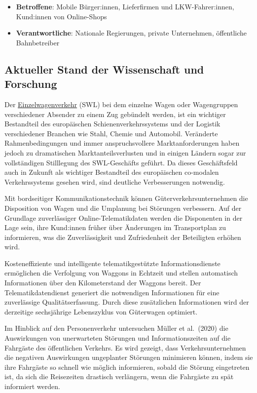 \documentclass[
]{book}
\providecommand{\tightlist}{%
  \setlength{\itemsep}{0pt}\setlength{\parskip}{0pt}}
\begin{document}
\begin{itemize}
\tightlist
\item
  \textbf{Betroffene}: Mobile Bürger:innen, Lieferfirmen und LKW-Fahrer:innen, Kund:innen von Online-Shops
\item
  \textbf{Verantwortliche}: Nationale Regierungen, private Unternehmen, öffentliche Bahnbetreiber
\end{itemize}

\hypertarget{aktueller-stand-der-wissenschaft-und-forschung-29}{%
\subsection*{Aktueller Stand der Wissenschaft und Forschung}\label{aktueller-stand-der-wissenschaft-und-forschung-29}}

Der \href{https://blog.railcargo.com/de/artikel/einzelwagenverkehr}{Einzelwagenverkehr} (SWL) bei dem einzelne Wagen oder Wagengruppen verschiedener Absender zu einem Zug gebündelt werden, ist ein wichtiger Bestandteil des europäischen Schienenverkehrssystems und der Logistik verschiedener Branchen wie Stahl, Chemie und Automobil. Veränderte Rahmenbedingungen und immer anspruchsvollere Marktanforderungen haben jedoch zu dramatischen Marktanteilsverlusten und in einigen Ländern sogar zur vollständigen Stilllegung des SWL-Geschäfts geführt. Da dieses Geschäftsfeld auch in Zukunft als wichtiger Bestandteil des europäischen co-modalen Verkehrssystems gesehen wird, sind deutliche Verbesserungen notwendig.

Mit bordseitiger Kommunikationstechnik können Güterverkehrsunternehmen die Disposition von Wagen und die Umplanung bei Störungen verbessern. Auf der Grundlage zuverlässiger Online-Telematikdaten werden die Disponenten in der Lage sein, ihre Kund:innen früher über Änderungen im Transportplan zu informieren, was die Zuverlässigkeit und Zufriedenheit der Beteiligten erhöhen wird.

Kosteneffiziente und intelligente telematikgestützte Informationsdienste ermöglichen die Verfolgung von Waggons in Echtzeit und stellen automatisch Informationen über den Kilometerstand der Waggons bereit. Der Telematikdatendienst generiert die notwendigen Informationen für eine zuverlässige Qualitätserfassung. Durch diese zusätzlichen Informationen wird der derzeitige sechsjährige Lebenszyklus von Güterwagen optimiert.

Im Hinblick auf den Personenverkehr untersuchen Müller et al.~(2020) die Auswirkungen von unerwarteten Störungen und Informationszeiten auf die Fahrgäste des öffentlichen Verkehrs. Es wird gezeigt, dass Verkehrsunternehmen die negativen Auswirkungen ungeplanter Störungen minimieren können, indem sie ihre Fahrgäste so schnell wie möglich informieren, sobald die Störung eingetreten ist, da sich die Reisezeiten drastisch verlängern, wenn die Fahrgäste zu spät informiert werden.
\end{document}
